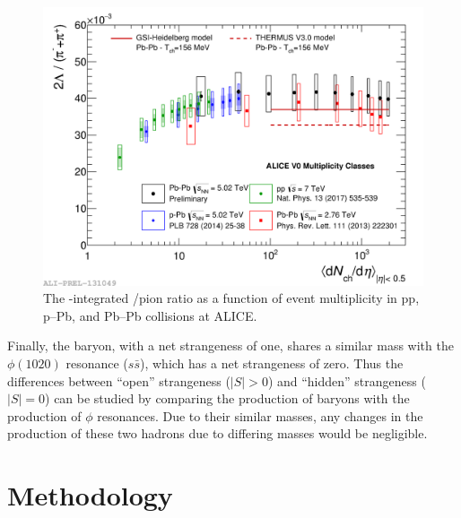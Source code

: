 \begin{figure}
\centering
\includegraphics[width=\textwidth]{figures/mnm/lambda_enhancement.png}
\caption{The \pt-integrated \lmb/pion ratio as a function of event multiplicity in pp, p--Pb, and Pb--Pb collisions at ALICE.}
\label{fig:lambda_enhancement}
\end{figure}

Finally, the \lmb baryon, with a net strangeness of one, shares a similar mass with the $\phi(1020)$ resonance ($s\bar{s}$), which has a net strangeness of zero. Thus the differences between ``open'' strangeness ($|S| > 0$) and ``hidden'' strangeness ($|S| = 0$) can be studied by comparing the production of \lmb baryons with the production of $\phi$ resonances. Due to their similar masses, any changes in the production of these two hadrons due to differing masses would be negligible.

\section{Methodology}

